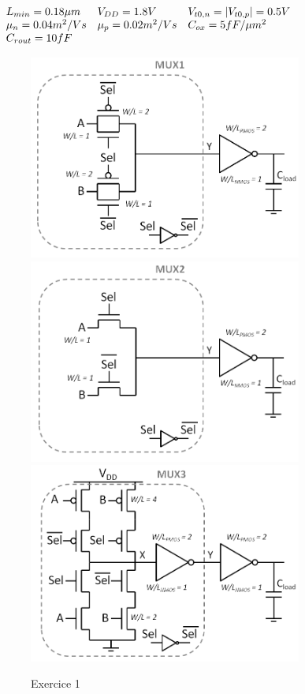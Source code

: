 \documentclass[frenchb,DIV=14]{scrartcl}
\begin{document}
\begin{center}
$
	\begin{array}{l l l}
		L_{min} = 0.18 \mu m 	& V_{DD} = 1.8 V 		& V_{t0,n} = |V_{t0,p} | = 0.5 V \\
		\mu_n = 0.04 m^2/Vs 	& \mu_p = 0.02 m^2/Vs	& C_{ox} = 5 fF/\mu m^2 \\
		C_{rout} = 10fF			&						& \\
	\end{array}
$
\end{center}

\begin{figure}[!htbp]
   \centering
   \includegraphics[width=9cm]{figures/fig7-3-1.png}
	 \includegraphics[width=9cm]{figures/fig7-3-2.png}
	 \includegraphics[width=9cm]{figures/fig7-3-3.png}
   \caption{Exercice 1}
   \label{fig7-3}
\end{figure}
\end{document}
